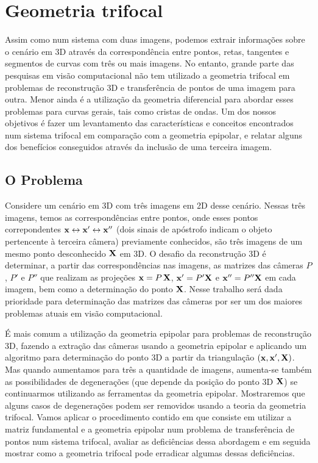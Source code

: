 \newpage
\section{Geometria trifocal}\label{sec.geo-tri}
Assim como num sistema com duas imagens, podemos extrair informações sobre o cenário em 3D através da correspondência entre pontos, retas, tangentes e segmentos de curvas com três  ou mais imagens. No entanto, grande parte das pesquisas em visão computacional não tem utilizado a geometria trifocal em problemas de reconstrução 3D e transferência de pontos de uma imagem para outra. Menor ainda é a utilização da geometria diferencial para abordar esses problemas para curvas gerais, tais como cristas de ondas. Um dos nossos objetivos é fazer um levantamento das características e conceitos encontrados num sistema trifocal em comparação com a geometria epipolar, e relatar alguns dos benefícios conseguidos através da inclusão de uma terceira imagem.

\subsection{O Problema}
Considere um cenário em 3D com três imagens em 2D desse cenário. Nessas três imagens, temos as correspondências entre pontos, onde esses pontos correpondentes $\mathbf{x}\leftrightarrow\mathbf{x}'\leftrightarrow\mathbf{x}''$ (dois sinais de apóstrofo indicam o objeto pertencente à terceira câmera) previamente conhecidos, são três imagens de um mesmo ponto desconhecido $\mathbf{X}$ em 3D. O desafio da reconstrução 3D é determinar, a partir das correspondências nas imagens, as matrizes das câmeras $P$, $P'$ e $P''$ que realizam as projeções $\mathbf{x}=P\,\mathbf{X}$, $\mathbf{x}'=P'\mathbf{X}$ e $\mathbf{x}''=P''\mathbf{X}$ em cada imagem, bem como a determinação do ponto $\mathbf{X}$. Nesse trabalho será dada prioridade para determinação das matrizes das câmeras por ser um dos maiores problemas atuais em visão computacional. 

É mais comum a utilização da geometria epipolar para problemas de reconstrução 3D, fazendo a extração das câmeras usando a geometria epipolar e aplicando um algoritmo para determinação do ponto 3D a partir da triangulação $(\mathbf{x},\mathbf{x}',\mathbf{X})$. Mas quando aumentamos para três a quantidade de imagens, aumenta-se também as possibilidades de degenerações (que depende  da posição do ponto 3D $\mathbf{X}$) se continuarmos utilizando as ferramentas da geometria epipolar. Mostraremos que alguns casos de degenerações podem ser removidos usando a teoria da geometria trifocal.
Vamos aplicar o procedimento contido em \citep{Faugeras} que consiste em utilizar a matriz fundamental e a geometria epipolar num problema de transferência de pontos num sistema trifocal, avaliar as deficiências dessa abordagem e em seguida mostrar como a geometria trifocal pode erradicar algumas dessas deficiências. 

